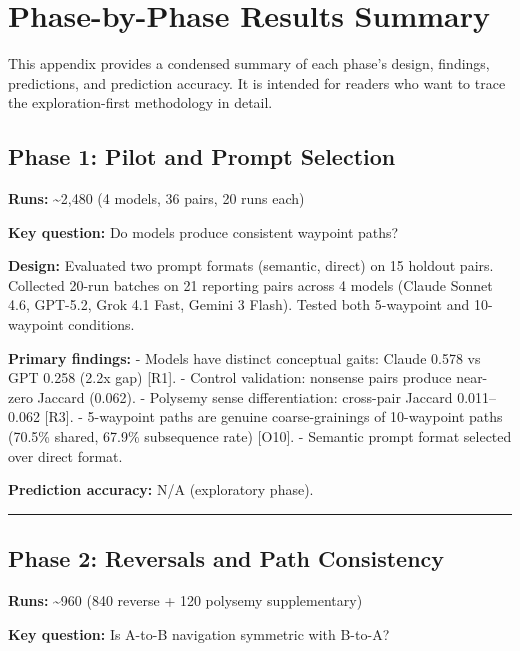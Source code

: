 \section{Phase-by-Phase Results Summary}\label{appendix-b-phase-by-phase-results-summary}

This appendix provides a condensed summary of each phase's design, findings, predictions, and prediction accuracy. It is intended for readers who want to trace the exploration-first methodology in detail.

\subsection{Phase 1: Pilot and Prompt Selection}\label{phase-1-pilot-and-prompt-selection}

\textbf{Runs:} \textasciitilde2,480 (4 models, 36 pairs, 20 runs each)

\textbf{Key question:} Do models produce consistent waypoint paths?

\textbf{Design:} Evaluated two prompt formats (semantic, direct) on 15 holdout pairs. Collected 20-run batches on 21 reporting pairs across 4 models (Claude Sonnet 4.6, GPT-5.2, Grok 4.1 Fast, Gemini 3 Flash). Tested both 5-waypoint and 10-waypoint conditions.

\textbf{Primary findings:} - Models have distinct conceptual gaits: Claude 0.578 vs GPT 0.258 (2.2x gap) {[}R1{]}. - Control validation: nonsense pairs produce near-zero Jaccard (0.062). - Polysemy sense differentiation: cross-pair Jaccard 0.011--0.062 {[}R3{]}. - 5-waypoint paths are genuine coarse-grainings of 10-waypoint paths (70.5\% shared, 67.9\% subsequence rate) {[}O10{]}. - Semantic prompt format selected over direct format.

\textbf{Prediction accuracy:} N/A (exploratory phase).

\begin{center}\rule{0.5\linewidth}{0.5pt}\end{center}

\subsection{Phase 2: Reversals and Path Consistency}\label{phase-2-reversals-and-path-consistency}

\textbf{Runs:} \textasciitilde960 (840 reverse + 120 polysemy supplementary)

\textbf{Key question:} Is A-to-B navigation symmetric with B-to-A?

